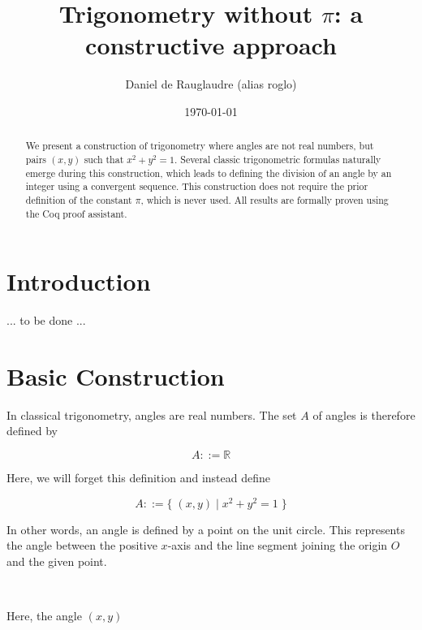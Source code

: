 \documentclass[11pt]{article}
\title{Trigonometry without $\pi$: a constructive approach}
\author{Daniel de Rauglaudre (alias roglo)}
\date{\today}
\begin{document}
\maketitle

\begin{abstract}
We present a construction of trigonometry where angles are not real
numbers, but pairs $(x,y)$ such that $x^2 + y^2 = 1$. Several classic
trigonometric formulas naturally emerge during this construction,
which leads to defining the division of an angle by an integer using a
convergent sequence. This construction does not require the prior
definition of the constant $\pi$, which is never used. All results are
formally proven using the Coq proof assistant.
\end{abstract}

\section{Introduction}

... to be done ...

\section{Basic Construction}

In classical trigonometry, angles are real numbers. The set \( A \) of
angles is therefore defined by

\[
A ::= \mathbb{R}
\]

\noindent Here, we will forget this definition and instead define

\[
A ::= \{ \; (x, y) \; | \; x^2 + y^2 = 1 \; \}
\]

\noindent In other words, an angle is defined by a point on the unit
circle. This represents the angle between the positive \( x \)-axis
and the line segment joining the origin \( O \) and the given point.

\

\noindent Here, the angle $(x, y)$

\

\end{document}
